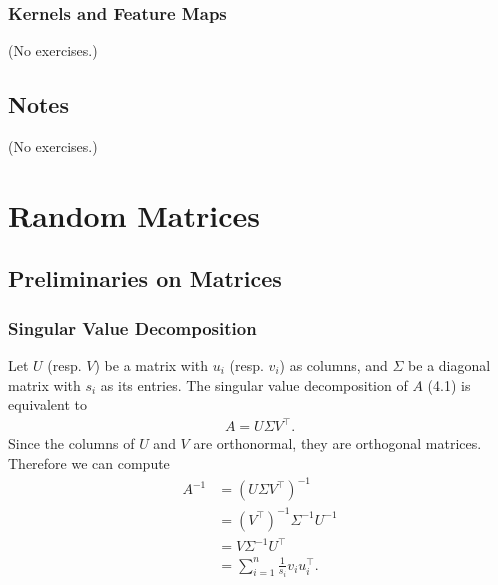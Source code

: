 \documentclass{report}
\theoremstyle{definition}
\newenvironment{exercise}[1]{
  \renewcommand\theexerciseimpl{#1}
  \exerciseimpl
}{\endexerciseimpl}
\begin{document}
\begin{exercise}{3.7.4}
\end{exercise}

\begin{exercise}{3.7.5}
\end{exercise}

\begin{exercise}{3.7.6}
\end{exercise}

\subsection{Kernels and Feature Maps}

(No exercises.)

\section{Notes}

(No exercises.)


\chapter{Random Matrices}

\section{Preliminaries on Matrices}

\subsection{Singular Value Decomposition}

\begin{exercise}{4.1.1}
  Let $U$ (resp. $V$) be a matrix with $u_i$ (resp. $v_i$) as columns, and $\Sigma$ be a diagonal matrix with $s_i$ as its entries.
  The singular value decomposition of $A$ (4.1) is equivalent to
  \begin{align*}
    A = U \Sigma V^{\top}.
  \end{align*}
  Since the columns of $U$ and $V$ are orthonormal, they are orthogonal matrices.
  Therefore we can compute
  \begin{align*}
    A^{-1} & = (U \Sigma V^{\top})^{-1} \\
    & = (V^{\top})^{-1} \Sigma^{-1} U^{-1} \\
    & = V \Sigma^{-1} U^{\top} \\
    & = \sum_{i=1}^n \frac{1}{s_i} v_i u_i^{\top}.
  \end{align*}
\end{exercise}
\end{document}
